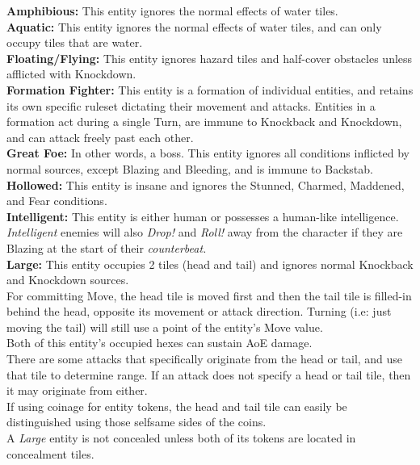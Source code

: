 \documentclass[12pt]{article}
\begin{document}
\begin{multicols*}{2}
\textbf{Amphibious:} This entity ignores the normal effects of water tiles.\\

\textbf{Aquatic:} This entity ignores the normal effects of water tiles, and can only occupy tiles that are water.\\

\textbf{Floating/Flying:} This entity ignores hazard tiles and half-cover obstacles unless afflicted with Knockdown.\\

\textbf{Formation Fighter:} This entity is a formation of individual entities, and retains its own specific ruleset dictating their movement and attacks. Entities in a formation act during a single Turn, are immune to Knockback and Knockdown, and can attack freely past each other.\\

\textbf{Great Foe:} In other words, a boss. This entity ignores all conditions inflicted by normal sources, except Blazing and Bleeding, and is immune to Backstab.\\

\textbf{Hollowed:} This entity is insane and ignores the Stunned, Charmed, Maddened, and Fear conditions.\\

\textbf{Intelligent:} This entity is either human or possesses a human-like intelligence. \emph{Intelligent} enemies will also \emph{Drop!} and \emph{Roll!} away from the character if they are Blazing at the start of their \emph{counterbeat.}\\

\textbf{Large:} This entity occupies 2 tiles (head and tail) and ignores normal Knockback and Knockdown sources.\\
For committing Move, the head tile is moved first and then the tail tile is filled-in behind the head, opposite its movement or attack direction. Turning (i.e: just moving the tail) will still use a point of the entity’s Move value.\\
Both of this entity’s occupied hexes can sustain AoE damage.\\
There are some attacks that specifically originate from the head or tail, and use that tile to determine range. If an attack does not specify a head or tail tile, then it may originate from either.\\
If using coinage for entity tokens, the head and tail tile can easily be distinguished using those selfsame sides of the coins.\\
A \emph{Large} entity is not concealed unless both of its tokens are located in concealment tiles.\\


\end{multicols*}
\end{document}
